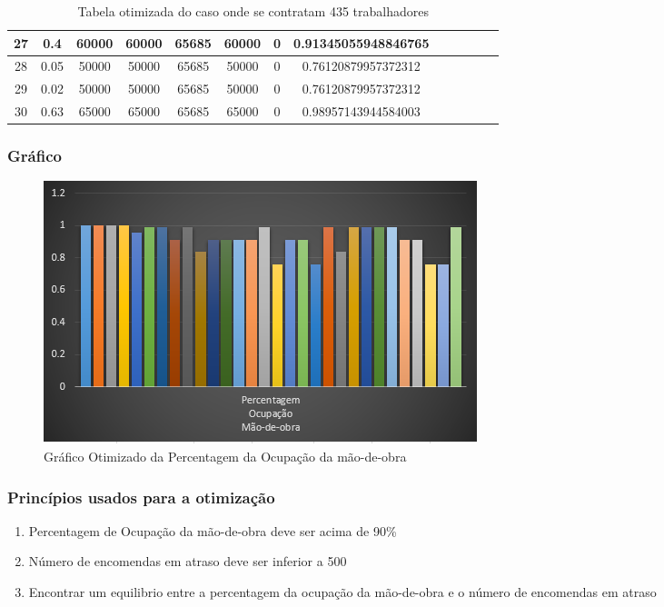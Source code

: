 \documentclass[10pt]{beamer}
\begin{document}
\begin{frame}
\begin{table}
{\begin{tabular}{ | c | c | c | c | c | c | c | c | c | c | c | c | c | }
	27 & 0.4 & 60000 & 60000 & 65685 & 60000 & 0 & 0.91345055948846765  \\ \hline
	28 & 0.05 & 50000 & 50000 & 65685 & 50000 & 0 & 0.76120879957372312  \\ \hline
	29 & 0.02 & 50000 & 50000 & 65685 & 50000 & 0 & 0.76120879957372312 \\ \hline
	30 & 0.63 & 65000 & 65000 & 65685 & 65000 & 0 & 0.98957143944584003 \\ \hline
\end{tabular}}
\caption{Tabela otimizada do caso onde se contratam 435 trabalhadores}
\end{table}
\end{frame}

\begin{frame}
\frametitle{Gráfico}
\begin{figure}[h]	\label{G1} 
\begin{center}
	\includegraphics[scale=0.5]{GOtimizado.PNG}
	\caption{Gráfico Otimizado da Percentagem da Ocupação da mão-de-obra}
\end{center}
\end{figure}
\end{frame}

\begin{frame}
\frametitle{Princípios usados para a otimização}
\begin{enumerate}
\item Percentagem de Ocupação da mão-de-obra deve ser acima de 90\%
\item Número de encomendas em atraso deve ser inferior a 500
\item Encontrar um equilibrio entre a percentagem da ocupação da mão-de-obra e o número de encomendas em atraso 
\end{enumerate}
\end{frame}
\end{document}
